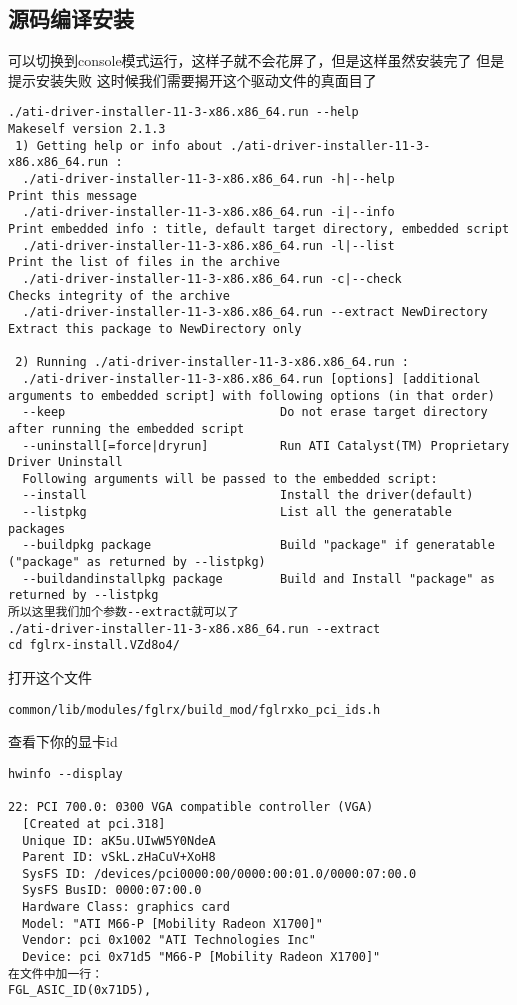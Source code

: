 \documentclass[adobefonts]{ctexart}
\begin{document}
\subsection{源码编译安装} %
可以切换到console模式运行，这样子就不会花屏了，但是这样虽然安装完了 但是提示安装失败
这时候我们需要揭开这个驱动文件的真面目了
\begin{verbatim}
./ati-driver-installer-11-3-x86.x86_64.run --help
Makeself version 2.1.3 
 1) Getting help or info about ./ati-driver-installer-11-3-x86.x86_64.run :
  ./ati-driver-installer-11-3-x86.x86_64.run -h|--help                     Print this message
  ./ati-driver-installer-11-3-x86.x86_64.run -i|--info                     Print embedded info : title, default target directory, embedded script 
  ./ati-driver-installer-11-3-x86.x86_64.run -l|--list                     Print the list of files in the archive
  ./ati-driver-installer-11-3-x86.x86_64.run -c|--check                    Checks integrity of the archive
  ./ati-driver-installer-11-3-x86.x86_64.run --extract NewDirectory        Extract this package to NewDirectory only
 
 2) Running ./ati-driver-installer-11-3-x86.x86_64.run :
  ./ati-driver-installer-11-3-x86.x86_64.run [options] [additional arguments to embedded script] with following options (in that order)
  --keep                              Do not erase target directory after running the embedded script
  --uninstall[=force|dryrun]          Run ATI Catalyst(TM) Proprietary Driver Uninstall
  Following arguments will be passed to the embedded script:
  --install                           Install the driver(default)
  --listpkg                           List all the generatable packages 
  --buildpkg package                  Build "package" if generatable ("package" as returned by --listpkg)
  --buildandinstallpkg package        Build and Install "package" as returned by --listpkg
所以这里我们加个参数--extract就可以了
./ati-driver-installer-11-3-x86.x86_64.run --extract
cd fglrx-install.VZd8o4/
\end{verbatim}
打开这个文件
\begin{verbatim}
common/lib/modules/fglrx/build_mod/fglrxko_pci_ids.h
\end{verbatim}
查看下你的显卡id
\begin{verbatim}
hwinfo --display

22: PCI 700.0: 0300 VGA compatible controller (VGA)             
  [Created at pci.318]
  Unique ID: aK5u.UIwW5Y0NdeA
  Parent ID: vSkL.zHaCuV+XoH8
  SysFS ID: /devices/pci0000:00/0000:00:01.0/0000:07:00.0
  SysFS BusID: 0000:07:00.0
  Hardware Class: graphics card
  Model: "ATI M66-P [Mobility Radeon X1700]"
  Vendor: pci 0x1002 "ATI Technologies Inc"
  Device: pci 0x71d5 "M66-P [Mobility Radeon X1700]"
在文件中加一行：
FGL_ASIC_ID(0x71D5),
\end{verbatim}
\end{document}
